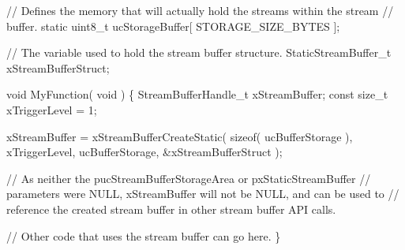\begin{DoxyPre}  // Defines the memory that will actually hold the streams within the stream
  // buffer.
  static uint8\_t ucStorageBuffer[ STORAGE\_SIZE\_BYTES ];\end{DoxyPre}



\begin{DoxyPre}  // The variable used to hold the stream buffer structure.
  StaticStreamBuffer\_t xStreamBufferStruct;\end{DoxyPre}



\begin{DoxyPre}  void MyFunction( void )
  \{
  StreamBufferHandle\_t xStreamBuffer;
  const size\_t xTriggerLevel = 1;\end{DoxyPre}



\begin{DoxyPre}   xStreamBuffer = xStreamBufferCreateStatic( sizeof( ucBufferStorage ),
                                              xTriggerLevel,
                                              ucBufferStorage,
                                              \&xStreamBufferStruct );\end{DoxyPre}



\begin{DoxyPre}   // As neither the pucStreamBufferStorageArea or pxStaticStreamBuffer
   // parameters were NULL, xStreamBuffer will not be NULL, and can be used to
   // reference the created stream buffer in other stream buffer API calls.\end{DoxyPre}



\begin{DoxyPre}   // Other code that uses the stream buffer can go here.
  \}\end{DoxyPre}



\begin{DoxyPre}  \end{DoxyPre}
 